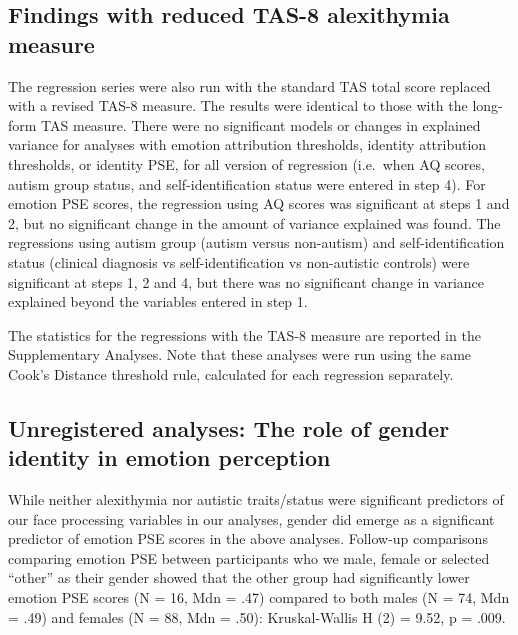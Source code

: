 \documentclass[
]{article}
\begin{document}
\hypertarget{findings-with-reduced-tas-8-alexithymia-measure}{%
\subsection*{Findings with reduced TAS-8 alexithymia measure}\label{findings-with-reduced-tas-8-alexithymia-measure}}

The regression series were also run with the standard TAS total score replaced with a revised TAS-8 measure. The results were identical to those with the long-form TAS measure. There were no significant models or changes in explained variance for analyses with emotion attribution thresholds, identity attribution thresholds, or identity PSE, for all version of regression (i.e.~when AQ scores, autism group status, and self-identification status were entered in step 4). For emotion PSE scores, the regression using AQ scores was significant at steps 1 and 2, but no significant change in the amount of variance explained was found. The regressions using autism group (autism versus non-autism) and self-identification status (clinical diagnosis vs self-identification vs non-autistic controls) were significant at steps 1, 2 and 4, but there was no significant change in variance explained beyond the variables entered in step 1.

The statistics for the regressions with the TAS-8 measure are reported in the Supplementary Analyses. Note that these analyses were run using the same Cook's Distance threshold rule, calculated for each regression separately.

\hypertarget{unregistered-analyses-the-role-of-gender-identity-in-emotion-perception}{%
\subsection*{Unregistered analyses: The role of gender identity in emotion perception}\label{unregistered-analyses-the-role-of-gender-identity-in-emotion-perception}}

While neither alexithymia nor autistic traits/status were significant predictors of our face processing variables in our analyses, gender did emerge as a significant predictor of emotion PSE scores in the above analyses. Follow-up comparisons comparing emotion PSE between participants who we male, female or selected ``other'' as their gender showed that the other group had significantly lower emotion PSE scores (N = 16, Mdn = .47) compared to both males (N = 74, Mdn = .49) and females (N = 88, Mdn = .50): Kruskal-Wallis H (2) = 9.52, p = .009.
\end{document}

